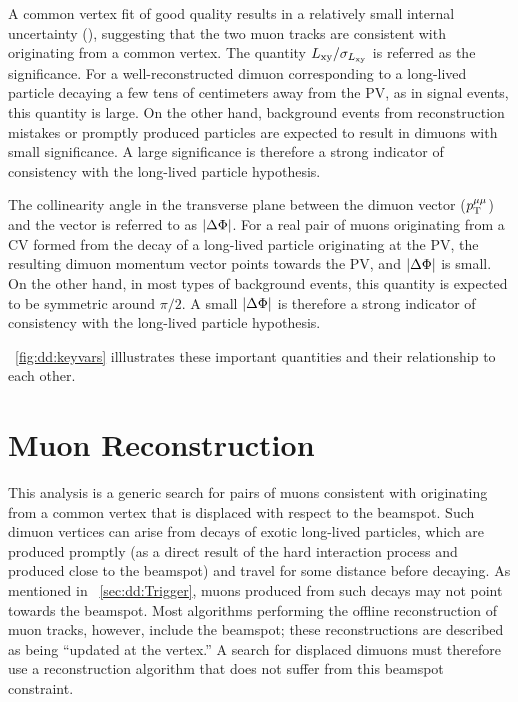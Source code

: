 A common vertex fit of good quality results in a relatively small internal \Lxy uncertainty (\LxyErr), suggesting that the two muon tracks are consistent with originating from a common vertex.
The quantity $L_{\mathrm{xy}}/\sigma_{L_{\mathrm{xy}}}$ is referred as the \Lxy significance.
For a well-reconstructed dimuon corresponding to a long-lived particle decaying a few tens of centimeters away from the PV, as in signal events, this quantity is large.
On the other hand, background events from reconstruction mistakes or promptly produced particles are expected to result in dimuons with small \Lxy significance.
A large \Lxy significance is therefore a strong indicator of consistency with the long-lived particle hypothesis.

The collinearity angle in the transverse plane between the dimuon \pT vector ($p_{\mathrm{T}}^{\mathrm{\mu}\mathrm{\mu}}$) and the \Lxy vector is referred to as $|\Delta\Phi|$.
For a real pair of muons originating from a CV formed from the decay of a long-lived particle originating at the PV, the resulting dimuon momentum vector points towards the PV, and $|\Delta\Phi|$ is small.
On the other hand, in most types of background events, this quantity is expected to be symmetric around $\pi/2$.
A small $|\Delta\Phi|$ is therefore a strong indicator of consistency with the long-lived particle hypothesis.

\Fig~\ref{fig:dd:keyvars} illlustrates these important quantities and their relationship to each other.

\section{Muon Reconstruction}
This analysis is a generic search for pairs of muons consistent with originating from a common vertex that is displaced with respect to the beamspot.
Such dimuon vertices can arise from decays of exotic long-lived particles, which are produced promptly (as a direct result of the hard interaction process and produced close to the beamspot) and travel for some distance before decaying.
As mentioned in \Sec~\ref{sec:dd:Trigger}, muons produced from such decays may not point towards the beamspot.
Most algorithms performing the offline reconstruction of muon tracks, however, include the beamspot; these reconstructions are described as being ``updated at the vertex.''
A search for displaced dimuons must therefore use a reconstruction algorithm that does not suffer from this beamspot constraint.

